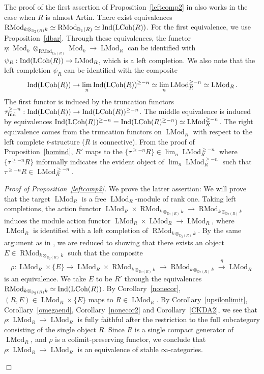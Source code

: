 \documentclass[leqno,12pt]{amsart}
\theoremstyle{plain}
\theoremstyle{definition}
\newcommand{\DD}{\mathbb{D}}
\newcommand{\Mod}{\operatorname{Mod}}
\newcommand{\Ind}{\operatorname{Ind}}
\newcommand{\LMod}{\operatorname{LMod}}
\newcommand{\RMod}{\operatorname{RMod}}
\newcommand{\QED}{{\unskip\nobreak\hfil\penalty50\quad\null\nobreak\hfil
{$\Box$}\parfillskip0pt\finalhyphendemerits0\par\medskip}}
\begin{document}
The proof of the first assertion of Proposition~\ref{leftcomp2} in \cite{IH} also works in the case when $R$ is almost Artin.
There exist equivalences $\RMod_{k\otimes_{\DD_2(R)}k}\simeq \RMod_{\DD_1(R)}\simeq \Ind(\textup{LCoh}(R))$.
For the first equivalence, we use Proposition~\ref{dbar}.
Through these equivalences, the functor
$\eta:\Mod_k\otimes_{\RMod_{\DD_2(R)}}\Mod_k\to \LMod_R$ can be identified with
$\psi_R:\Ind(\textup{LCoh}(R))\to \LMod_R$, which is a left completion.
We also note that the left completion $\psi_R$
can be identified with the composite
\[
\Ind(\textup{LCoh}(R))\to \lim_{n} \Ind(\textup{LCoh}(R))^{\ge -n}\simeq \lim_{n} \LMod_R^{\ge -n}\simeq \LMod_R.
\]
The first functor is induced by the truncation functors $\tau_{\Ind}^{\ge -n}:\Ind(\textup{LCoh}(R))\to \Ind(\textup{LCoh}(R))^{\ge -n}$.
The middle equivalence is induced by equivalences $\Ind(\textup{LCoh}(R))^{\ge -n}=\Ind(\textup{LCoh}(R)^{\ge -n})\simeq \LMod_R^{\ge -n}$.
The right equivalence comes from the truncation functors on $\LMod_R$ with respect to the left complete $t$-structure ($R$ is connective).
From the proof of Proposition~\ref{homind}, $R'$ maps to the $\{\tau^{\ge -n}R\}\in \lim_{n} \LMod_R^{\ge -n}$ where 
$\{\tau^{\ge -n}R\}$ informally indicates the evident object of $\lim_{n} \LMod_R^{\ge -n}$ such that $\tau^{\ge -n}R\in \LMod_R^{\ge -n}$.


\vspace{3mm}



{\it Proof of Proposition~\ref{leftcomp2}.}
We prove the latter assertion:
We will prove that the target $\LMod_R$ is a free $\LMod_R$-module of rank one.
Taking left completions, the action functor $\LMod_R\times \RMod_{k\otimes_{\DD_2(R)}k} \to \RMod_{k\otimes_{\DD_2(R)}k}$
induces the module action functor $\LMod_R\times \LMod_R\to \LMod_R$, where $\LMod_R$ is identified with a left completion of $\RMod_{k\otimes_{\DD_2(R)}k}$.
By the same argument as in \cite{IH}, we are reduced to showing that
there exists an object $E\in \RMod_{k\otimes_{\DD_2(R)}k}$ such that the composite 
\[
\rho:\LMod_R\times \{E\}\to \LMod_R\times \RMod_{k\otimes_{\DD_2(R)}k}\to  \RMod_{k\otimes_{\DD_2(R)}k}  \stackrel{\eta}{\to} \LMod_R
\]
is an equivalence.
We take $E$ to be $R'$ through the equivalences
$\RMod_{k\otimes_{\DD_2(R)}k}\simeq  \Ind(\textup{LCoh}(R))$.
By Corollary~\ref{nonecor}, $(R,E)\in \LMod_R\times \{E\}$ maps to $R\in \LMod_R$.
By Corollary~\ref{upsilonlimit}, Corollary~\ref{omegaend}, Corollary~\ref{nonecor2} and Corollary~\ref{CKDA2}, 
we see that $\rho:\LMod_R\to \LMod_R$
is fully faithful after the restriction to the full subcategory consisting of the single object $R$.
Since $R$ is a single compact generator of $\LMod_R$, and $\rho$ is a colimit-preserving functor,
we conclude that $\rho:\LMod_R\to \LMod_R$ is an equivalence of stable $\infty$-categories.
\QED
\end{document}
